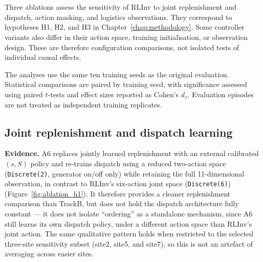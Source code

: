 \section{}
\label{sec:mechanism}

\begin{revisedblock}

Three ablations assess the sensitivity of RLInv
to joint replenishment and dispatch, action
masking, and logistics observations. They
correspond to hypotheses H1, H2, and H3 in
Chapter~\ref{chap:methodology}. Some controller
variants also differ in their action space,
training initialisation, or observation design.
These are therefore configuration comparisons,
not isolated tests of individual causal effects.


The analyses use the same ten training seeds as the
original evaluation. Statistical comparisons are paired
by training seed, with significance assessed using
paired $t$-tests and effect sizes reported as
Cohen's $d_z$. Evaluation episodes are not treated
as independent training replicates.
\end{revisedblock}



\subsection{Joint replenishment and dispatch learning}
\label{sec:mechanism_h1}

\textbf{Evidence.} A6 replaces jointly learned replenishment with an
external calibrated $(s,S)$ policy and re-trains dispatch using a
reduced two-action space (\texttt{Discrete(2)}, generator on/off only)
while retaining the full 11-dimensional observation, in contrast to
RLInv's six-action joint space (\texttt{Discrete(6)}) (Figure~\ref{fig:ablation_h1}). It therefore
provides a cleaner replenishment comparison than TrackB, but does not
hold the dispatch architecture fully constant --- it does not isolate
``ordering'' as a standalone mechanism, since A6
still learns its own dispatch policy, under a different action space
than RLInv's joint action. 
The same qualitative
pattern holds when restricted to the selected three-site sensitivity
subset (site2, site5, and site7), so
this is not an artefact of averaging across easier sites.


